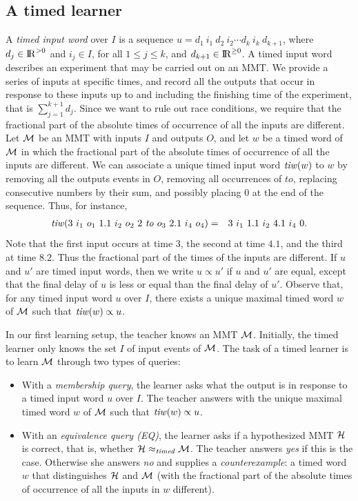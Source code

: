 \subsection{A timed learner}
A \emph{timed input word} over $I$ is a sequence
$u = d_1 ~ i_1 ~ d_2 ~ i_2 \cdots d_k ~ i_k ~ d_{k+1}$, where $d_j \in {\rm I\!R}^{> 0}$ and $i_j \in I$, for all $1 \leq j \leq k$,
and $d_{k+1} \in {\rm I\!R}^{\geq 0}$.
A timed input word describes an experiment that may be carried out on an MMT. We provide a series of inputs at specific times, and record all the outputs that occur in response to these inputs up to and including the finishing time of the experiment, that is $\sum_{j=1}^{k+1} d_j$.
Since we want to rule out race conditions, we require that the fractional part of the absolute times of occurrence of
all the inputs are different.
Let ${\cal M}$ be an MMT with inputs $I$ and outputs $O$, and
let $w$ be a timed word of ${\cal M}$ in which the fractional part of the absolute times of occurrence of
all the inputs are different.
We can associate a unique timed input word $\mathit{tiw}(w)$ to $w$ by 
removing all the outputs events in $O$, 
removing all occurrences of $\mathit{to}$, 
replacing consecutive numbers by their sum, 
and possibly placing $0$ at the end of the sequence.
Thus, for instance,
\begin{eqnarray*}
\mathit{tiw} (3 ~ i_1 ~ o_1 ~ 1.1 ~ i_2 ~ o_2 ~ 2 ~ \mathit{to} ~ o_3 ~ 2.1 ~ i_4 ~ o_4) & = & 
3 ~ i_1 ~ 1.1 ~ i_2 ~ 4.1 ~ i_4 ~ 0.
\end{eqnarray*}
Note that the first input occurs at time $3$, the second at time $4.1$, and the third at time $8.2$.
Thus the fractional part of the times of the inputs are different.
%
If $u$ and $u'$ are timed input words, then we write $u \propto u'$ if $u$ and $u'$ are equal, except that the final delay of $u$ is less or equal than the final delay of $u'$. Observe that,
for any timed input word $u$ over $I$, 
there exists a unique maximal timed word $w$ of ${\cal M}$ such that $\mathit{tiw}(w) \propto u$.

In our first learning setup, the teacher knows an MMT ${\cal M}$.
Initially, the timed learner only knows the set $I$ of input events of ${\cal M}$.
The task of a timed learner is to learn ${\cal M}$ through two types of queries:
\begin{itemize}
\item
With a \emph{membership query}, the learner asks what the output is in response to a timed input word $u$ over $I$. 
The teacher answers with the unique maximal timed word $w$ of ${\cal M}$ such that $\mathit{tiw}(w) \propto u$.
\item
With an \emph{equivalence query (EQ)}, the learner asks if a hypothesized MMT ${\cal H}$ is correct, that is, 
whether ${\cal H} \approx_{\mathit{timed}} {\cal M}$.
The teacher answers \emph{yes} if this is the case. Otherwise she answers \emph{no} and supplies a
\emph{counterexample}: a timed word $w$ that distinguishes ${\cal H}$ and ${\cal M}$
(with the fractional part of the absolute times of occurrence of all the inputs in $w$ different).
\end{itemize}

